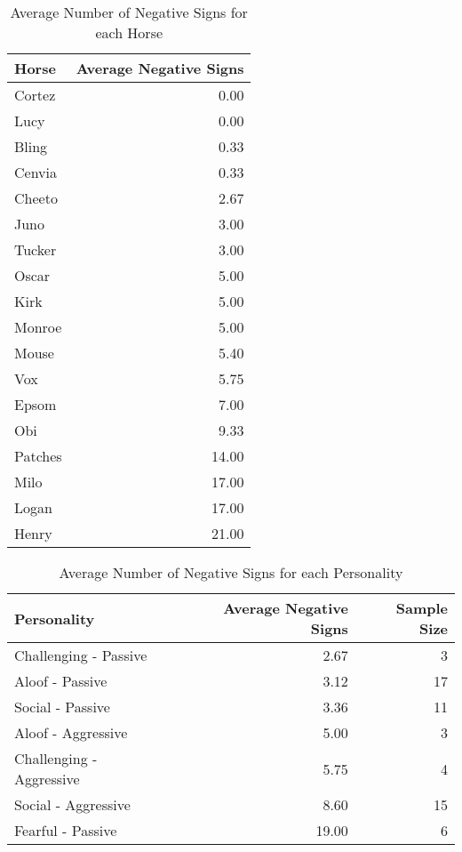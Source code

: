 \documentclass[
]{article}
\begin{document}
\begin{table}

\caption{\label{tab:unnamed-chunk-2}Average Number of Negative Signs for each Horse}
\fontsize{20}{22}\selectfont
\begin{tabular}[t]{l|r}
\hline
Horse & Average Negative Signs\\
\hline
\textcolor{olivedrab3}{Cortez} & \textcolor{olivedrab3}{0.00}\\
\hline
Lucy & 0.00\\
\hline
Bling & 0.33\\
\hline
Cenvia & 0.33\\
\hline
Cheeto & 2.67\\
\hline
Juno & 3.00\\
\hline
Tucker & 3.00\\
\hline
Oscar & 5.00\\
\hline
Kirk & 5.00\\
\hline
Monroe & 5.00\\
\hline
Mouse & 5.40\\
\hline
Vox & 5.75\\
\hline
Epsom & 7.00\\
\hline
Obi & 9.33\\
\hline
Patches & 14.00\\
\hline
Milo & 17.00\\
\hline
Logan & 17.00\\
\hline
Henry & 21.00\\
\hline
\end{tabular}
\end{table}

\begin{table}

\caption{\label{tab:unnamed-chunk-3}Average Number of Negative Signs for each Personality}
\centering
\begin{tabular}[t]{l|r|r}
\hline
Personality & Average Negative Signs & Sample Size\\
\hline
Challenging - Passive & 2.67 & 3\\
\hline
Aloof - Passive & 3.12 & 17\\
\hline
Social - Passive & 3.36 & 11\\
\hline
Aloof - Aggressive & 5.00 & 3\\
\hline
Challenging - Aggressive & 5.75 & 4\\
\hline
Social - Aggressive & 8.60 & 15\\
\hline
Fearful - Passive & 19.00 & 6\\
\hline
\end{tabular}
\end{table}
\end{document}

